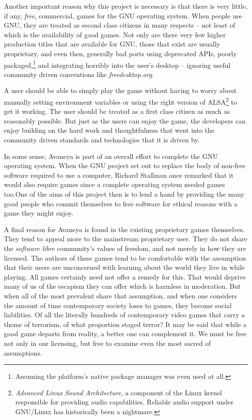 Another important reason why this project is necessary is that there is very little, if any, {\it free}, commercial, games for the GNU operating system. When people use GNU, they are treated as second class citizens in many respects -- not least of which is the availability of good games. Not only are there very few higher production titles that are available for GNU, those that exist are usually proprietary, and even then, generally bad ports using deprecated APIs, poorly packaged,\footnote{Assuming the platform's native package manager was even used at all.} and integrating horribly into the user's desktop -- ignoring useful community driven conventions like {\it freedesktop.org}. 

A user should be able to simply play the game without having to worry about manually setting environment variables or using the right version of ALSA\footnote{{\it Advanced Linux Sound Architecture}, a component of the Linux kernel responsible for providing audio capabilities. Reliable audio support under GNU/Linux has historically been a nightmare.} to get it working. The user should be treated as a first class citizen as much as reasonably possible. But just as the users can enjoy the game, the developers can enjoy building on the hard work and thoughtfulness that went into the community driven standards and technologies that it is driven by.

In some sense, Avaneya is part of an overall effort to complete the GNU operating system. When the GNU project set out to replace the body of non-free software required to use a computer, Richard Stallman once remarked that it would also require games since a complete operating system needed games too. One of the aims of this project then is to lend a hand by providing the many good people who commit themselves to free software for ethical reasons with a game they might enjoy.

A final reason for Avaneya is found in the existing proprietary games themselves. They tend to appeal more to the mainstream proprietary user. They do not share the {\it software libre} community's values of freedom, and not merely in how they are licensed. The authors of these games tend to be comfortable with the assumption that their users are unconcerned with learning about the world they live in while playing. All games certainly need not offer a remedy for this. That would deprive many of us of the escapism they can offer which is harmless in moderation. But when all of the most prevalent share that assumption, and when one considers the amount of time contemporary society loses to games, they become social liabilities. Of all the literally hundreds of contemporary video games that carry a theme of terrorism, of what proportion staged terror? It may be said that while a good game departs from reality, a better one can complement it. We must be free not only in our licensing, but free to examine even the most sacred of assumptions.

